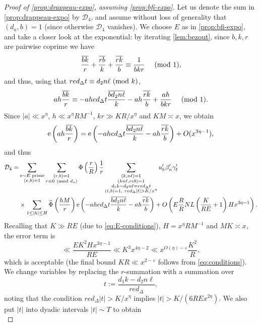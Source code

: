 \documentclass[reqno,11pt]{amsart}
\theoremstyle{definition}
\theoremstyle{remark}
\numberwithin{equation}{section}
\newcommand{\mD}{\mathcal{D}}
\newcommand{\e}{\textnormal{e}}
\newcommand{\eps}{\varepsilon}
\renewcommand{\bar}{\overline}
\renewcommand{\hat}{\widehat}
\renewcommand{\pmod}[1]{\ (\textnormal{mod } #1)}
\begin{document}
\begin{proof}[Proof of \cref{prop:drappeau-expo}, assuming \cref{prop:bfi-expo}]
Let us denote the sum in \cref{prop:drappeau-expo} by $\mD_4$, and assume without loss of generality that $(d_a, b) = 1$ (since otherwise $\mD_4$ vanishes). We choose $E$ as in \cref{prop:bfi-expo}, and take a closer look at the exponential: by iterating \cref{lem:bezout}, since $b, k, r$ are pairwise coprime we have
\[
    \frac{\bar{bk}}{r} + \frac{\bar{rb}}{k} + \frac{\bar{rk}}{b} \equiv \frac{1}{bkr} \quad \pmod{1},
\]
and thus, using that $re d_\Delta t \equiv d_2 n \ell \pmod{k}$,
\[
    ah\frac{\bar{b k}}{r} \equiv 
    - ah e d_\Delta t \frac{\bar{b d_2n\ell}}{k} - ah\frac{\bar{rk}}{b} + \frac{ah}{b k r} \quad \pmod{1}.
\]
Since $|a| \ll x^\eta$, $h \ll x^\eta R M^{-1}$, $kr \gg KR/x^\eta$ and $KM \asymp x$, we obtain
\[
    \e\left(ah \frac{\bar{b k}}{r} \right)
    =
    \e\left(- ahe d_\Delta t \frac{\bar{b d_2n \ell}}{k} - ah\frac{\bar{rk}}{b} \right)
    +
    O(x^{3\eta-1}),
\]
and thus
\[
\begin{aligned}
    \mD_4 =
    &\sum_{\substack{e \sim E \text{ prime} \\ (e, b) = 1}} \sum_{\substack{(r, b) = 1 \\ r \equiv 0 \pmod{d_a}}} \Phi\left(\frac{r}{R}\right) \frac{1}{r} 
    \sum_{\substack{(k, n\ell) = 1 \\ (k n \ell, reb) = 1 \\ d_1k - d_2n \ell = red_\Delta t \\ (t, b) = 1,\  red_\Delta |t| > K/x^\eta}} u'_k \beta'_n \gamma'_\ell
    \\
    &\times 
    \sum_{1 \le |h| \le H} \hat{\Phi}\left(\frac{hM}{r}\right) \e\left(- ahe d_\Delta t \frac{\bar{b d_2n \ell}}{k} - ah\frac{\bar{rk}}{b} \right)
    + O\left(E\frac{R}{R}NL \left(\frac{K}{RE} + 1\right) H x^{3\eta - 1} \right).
\end{aligned}
\]
Recalling that $K \gg RE$ (due to \cref{eq:E-conditions}), $H = x^\eta RM^{-1}$ and $MK \asymp x$, the error term is
\[
    \ll \frac{EK^2 H x^{3\eta - 1}}{RE} 
    \ll K^3 x^{4\eta - 2}
    \ll x^{O(\eta)-\eps} \frac{K^2}{R}, 
\]
which is acceptable (the final bound $KR \ll x^{2-\eps}$ follows from \cref{eq:conditions}). We change variables by replacing the $r$-summation with a summation over 
\[
    t := \frac{d_1 k - d_2 n \ell}{red_\Delta},
\]
noting that the condition $red_\Delta |t| > K/x^\eta$ implies $|t| > K/(6RE x^{2\eta})$. We also put $|t|$ into dyadic intervals $|t| \sim T$ to obtain
\begin{equation} \label{eq:D45}

\end{equation}
\end{proof}
\end{document}
